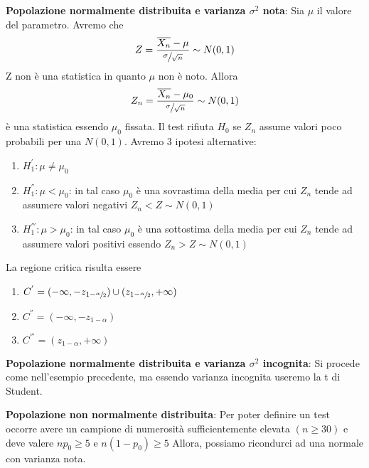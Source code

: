 \ind \textbf{Popolazione normalmente distribuita e varianza $\sigma^2$ nota}: Sia $\mu$ il valore del parametro. Avremo che $$Z = \dfrac{\overline{X_n} - \mu}{\sfrac{\sigma}{\sqrt{n}}} \sim N(0,1)$$ Z non è una statistica in quanto $\mu$ non è noto. Allora $$Z_n = \dfrac{\overline{X_n} - \mu_0}{\sfrac{\sigma}{\sqrt{n}}} \sim N(0,1)$$ è una statistica essendo $\mu_0$ fissata. Il test rifiuta $H_0$ se $Z_n$ assume valori poco probabili per una $N(0,1)$. Avremo 3 ipotesi alternative:
\begin{enumerate}
    \item $H_1^{'}: \mu \neq \mu_0$
    \item $H_1^{''}: \mu < \mu_0$: in tal caso $\mu_0$ è una sovrastima della media per cui $Z_n$ tende ad assumere valori negativi $Z_n < Z \sim N(0,1)$
    \item $H_1^{'''}: \mu > \mu_0$: in tal caso $\mu_0$ è una sottostima della media per cui $Z_n$ tende ad assumere valori positivi essendo $Z_n > Z \sim N(0,1)$
\end{enumerate}
La regione critica risulta essere 
\begin{enumerate}
    \item $C^{'}= (-\infty, -z_{1 - \sfrac{\alpha}{2}}) \cup (z_{1 - \sfrac{\alpha}{2}}, +\infty)$
    \item $C^{''} = (-\infty, -z_{1 - \alpha})$
    \item $C^{'''} = (z_{1 - \alpha}, +\infty) $
\end{enumerate}

 \n


\ind \textbf{Popolazione normalmente distribuita e varianza $\sigma^2$ incognita}: Si procede come nell'esempio precedente, ma essendo varianza incognita useremo la t di Student. \n

\ind \textbf{Popolazione non normalmente distribuita}: Per poter definire un test occorre avere un campione di numerosità sufficientemente elevata $(n \geq 30)$ e deve valere $np_0 \geq 5$ e $n(1 - p_0) \geq 5$ Allora, possiamo ricondurci ad una normale con varianza nota. 



